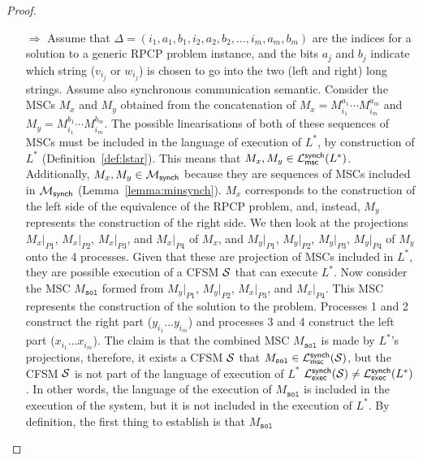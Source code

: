 \begin{proof}
	\begin{itemize}
		\item[$\Rightarrow$]
		      Assume that
		      $\Delta = (i_1, a_1, b_1, i_2, a_2, b_2, \ldots, i_m, a_m, b_m)$ are the indices
		      for a solution to a generic RPCP problem instance, and the bits $a_j$ and
		      $b_j$ indicate which string ($v_{i_j}$ or $w_{i_j}$) is chosen to go into
		      the two (left and right) long strings. Assume also synchronous communication semantic.
			  Consider the MSCs $M_x$ and $M_y$ obtained from the concatenation of
		      $M_x = M^{a_1}_{i_1} \cdots M^{a_m}_{i_m}$ 
			  and $M_y = M^{b_1}_{i_1} \cdots M^{b_m}_{i_m}$.
		      The possible linearisations of both of these sequences of MSCs 
			  must be included in the language of execution of $L^*$, by construction 
			  of $L^*$ (Definition~\ref{def:lstar}). 
			  This means that $M_x, M_y \in \mathcal{L}_{\mathsf{msc}}^{\mathsf{synch}}(L^*)$.
			  Additionally, $M_x,M_y\in \mathcal{M}_{\mathsf{synch}}$
			  because they are sequences of MSCs included in
			  $\mathcal{M}_{\mathsf{synch}}$ (Lemma~\ref{lemma:minsynch}).
		      $M_x$ corresponds to the construction of the left side of the equivalence of the RPCP
		      problem, and, instead, $M_y$ represents the construction of the right side.
		      We then look at the projections $M_x|_{P1}$, $M_x|_{P2}$, $M_x|_{P3}$,
		      and $M_x|_{P4}$ of $M_x$, and $M_y|_{P1}$, $M_y|_{P2}$, $M_y|_{P3}$, $M_y|_{P4}$ of $M_y$ onto the
		      4 processes.
			  Given that these are projection of MSCs included in $L^*$,
			  they are possible execution of a CFSM $\mathcal{S}$ that can execute $L^*$.
			  Now consider the MSC $M_{\texttt{sol}}$ 
			  formed from $M_y|_{P1}$, $M_y|_{P2}$, $M_x|_{P3}$, and $M_x|_{P4}$.
		      This MSC represents the construction of the solution to
		      the problem. Processes 1 and 2 construct the right part ($y_{i_1}...y_{i_m}$)
		      and processes 3 and 4 construct the left part ($x_{i_1}...x_{i_m}$).
		      The claim is that the combined MSC $M_{\texttt{sol}}$ is 
		      made by $L^*$'s projections, therefore, it exists a CFSM $\mathcal{S}$
			  that $M_{\texttt{sol}} \in \mathcal{L}_{\mathsf{msc}}^{\mathsf{synch}}(\mathcal{S})$,
			  but the CFSM $\mathcal{S}$ is not part of the language of execution of $L^*$ 
			  $\mathcal{L}_{\mathsf{exec}}^{\mathsf{synch}}(\mathcal{S}) \neq \mathcal{L}_{\mathsf{exec}}^{\mathsf{synch}}(L^*)$. 
			  In other words, the language of the execution of $M_{\texttt{sol}}$ is included
			  in the execution of the system, but it is not included in the execution of $L^*$. 
			  By definition, the first thing to establish is that $M_{\texttt{sol}}$

\end{itemize}
\end{proof}

